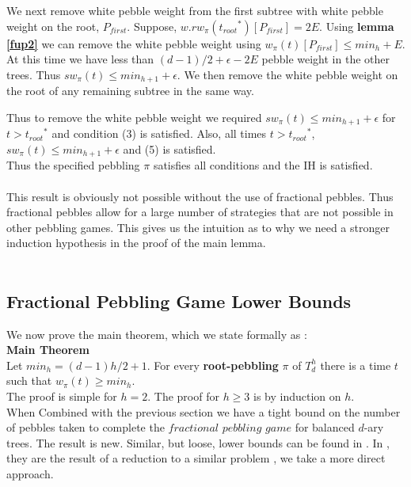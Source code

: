 \documentclass[12pt]{article}
\newcommand{\troots}{{t_{root}}^*}
\begin{document}
We next remove white pebble weight from the first subtree with white pebble weight on the root, $P_{first}$. Suppose, $w.rw_\pi(\troots)[P_{first}] = 2E$. Using {\bf lemma \ref{fup2}} we can remove the white pebble weight using $w_\pi(t)[P_{first}] \leq min_h + E$. At this time we have less than $(d-1)/2+\epsilon - 2E$ pebble weight in the other trees. Thus $sw_\pi(t) \leq min_{h+1}+\epsilon$. We then remove the white pebble weight on the root of any remaining subtree in the same way.

Thus to remove the white pebble weight we required $sw_\pi(t) \leq min_{h+1}+\epsilon$ for $t>\troots$ and condition (3) is satisfied. Also, all times $t > \troots$, $sw_\pi(t) \leq min_{h+1}+\epsilon$ and (5) is satisfied.\\

Thus the specified pebbling $\pi$ satisfies all conditions and the IH is satisfied.\\\\

This result is obviously not possible without the use of fractional pebbles. Thus fractional pebbles allow for a large number of strategies that are not possible in other pebbling games. This gives us the intuition as to why we need a stronger induction hypothesis in the proof of the main lemma.\\\\
 

\subsection{Fractional Pebbling Game Lower Bounds} 

\noindent
We now prove the main theorem, which we state formally as :\\

\noindent
{\bf Main Theorem} \\Let $min_h = (d-1)h/2+1$.
For every {\bf root-pebbling} $\pi$ of $T^h_d$ there is a time $t$ such
that $w_\pi(t) \ge min_h$.\\

\noindent
The proof is simple for $h=2$. The proof for $h\geq3$ is by induction on $h$.\\

When Combined with the previous section we have a tight bound on the number of pebbles taken to complete the $fractional $ $pebbling$ $game$ for balanced $d$-ary trees. The result is new. Similar, but loose, lower bounds can be found in \cite{c:pebjournal}. In \cite{c:pebjournal}, they are the result of a reduction to a similar problem \cite{k:bwpyr}, we take a more direct approach.
\end{document}

